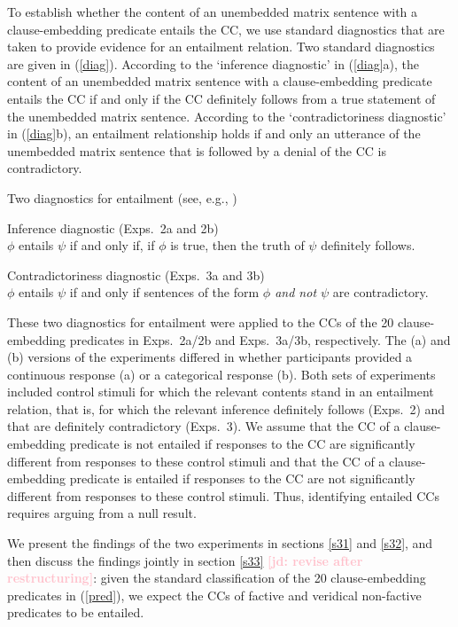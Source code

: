 \documentclass[11pt,fleqn]{article}
\newcommand{\jd}[1]{\textbf{\textcolor{Pink}{[jd: #1]}}}
\newcommand{\6}{\mbox{$[\hspace*{-.6mm}[$}}
\newcommand{\9}{\mbox{$]\hspace*{-.6mm}]$}}
\begin{document}
To establish whether the content of an unembedded matrix sentence with a clause-embedding predicate entails the CC, we use standard diagnostics that are taken to provide evidence for an entailment relation. Two standard diagnostics are given in (\ref{diag}). According to the `inference diagnostic' in (\ref{diag}a), the content of an unembedded matrix sentence with a clause-embedding predicate entails the CC if and only if the CC definitely follows from a true statement of the unembedded matrix sentence. According to the `contradictoriness diagnostic' in (\ref{diag}b), an entailment relationship holds if and only an utterance of the unembedded matrix sentence that is followed by a denial of the CC is contradictory. 

\begin{exe}
\ex\label{diag} Two diagnostics for entailment \hfill (see, e.g., \citealt[\S3.1]{ccmg90})
\begin{xlist}
\ex  Inference diagnostic (Exps.~2a and 2b)\\ $\phi$ entails $\psi$ if and only if, if $\phi$ is true, then the truth of $\psi$ definitely follows. 

\ex  Contradictoriness diagnostic  (Exps.~3a and 3b)\\ $\phi$ entails $\psi$ if and only if sentences of the form {\em $\phi$ and not $\psi$} are contradictory. 

\end{xlist}
\end{exe}
These two diagnostics for entailment were applied to the CCs of the 20 clause-embedding predicates in Exps.~2a/2b and Exps.~3a/3b, respectively. The (a) and (b) versions of the experiments differed in whether participants provided a continuous response (a) or a categorical response (b).  Both sets of experiments included control stimuli for which the relevant contents stand in an entailment relation, that is, for which the relevant inference definitely follows (Exps.~2) and that are definitely contradictory (Exps.~3). We assume that the CC of a clause-embedding predicate is not entailed if responses to the CC are significantly different from responses to these control stimuli and that the CC of a clause-embedding predicate is entailed if responses to the CC are not significantly different from responses to these control stimuli. Thus, identifying entailed CCs  requires arguing from a null result. 

We present the findings of the two experiments in sections \ref{s31} and \ref{s32}, and then discuss the findings jointly in section \ref{s33} \jd{revise after restructuring}: given the standard classification of the 20 clause-embedding predicates in (\ref{pred}), we expect the CCs of factive and veridical non-factive predicates to be entailed.
\end{document}
